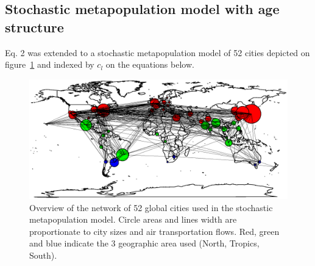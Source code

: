 \documentclass[12pt]{article}
\begin{document}
\clearpage

\subsection{Stochastic metapopulation model with age structure}

Eq. 2 was extended to a stochastic metapopulation model of 52 cities
depicted on figure~\ref{fig:iata} and indexed by $c_l$ on the equations
below.

\begin{figure}[htb]
  \center
  \includegraphics[width= 0.8 \linewidth]{graph_annexe/iata.eps}
  \caption{Overview of the network of 52 global cities used in the
    stochastic metapopulation model. Circle areas and lines width are
    proportionate to city sizes and air transportation flows. Red,
    green and blue indicate the 3 geographic area used (North,
    Tropics, South).}
  \label{fig:iata}
\end{figure}
\end{document}
